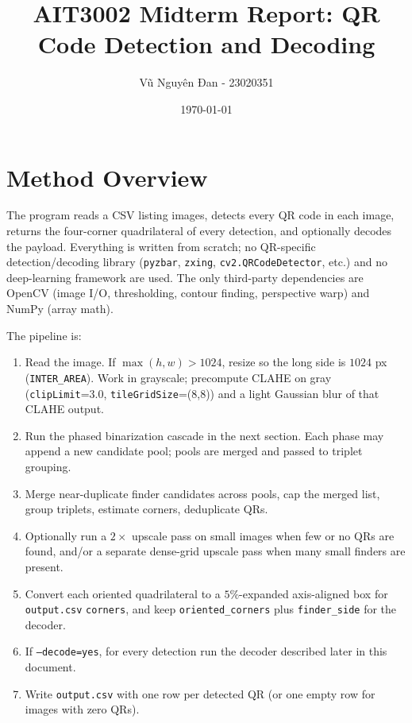 \documentclass[11pt,a4paper]{article}
\title{AIT3002 Midterm Report: QR Code Detection and Decoding}
\author{Vũ Nguyên Đan - 23020351}
\date{\today}
\begin{document}
\maketitle

\section{Method Overview}

The program reads a CSV listing images, detects every QR code in each image,
returns the four-corner quadrilateral of every detection, and optionally
decodes the payload. Everything is written from scratch; no QR-specific detection/decoding library
(\texttt{pyzbar}, \texttt{zxing}, \texttt{cv2.QRCodeDetector}, etc.) and no
deep-learning framework are used.  The only third-party dependencies are
OpenCV (image I/O, thresholding, contour finding, perspective warp) and
NumPy (array math).

The pipeline is:

\begin{enumerate}[leftmargin=1.6em, itemsep=0.2em]
    \item Read the image. If $\max(h,w) > 1024$, resize so the long side is
          $1024$ px (\texttt{INTER\_AREA}). Work in grayscale; precompute
          CLAHE on gray (\texttt{clipLimit}=3.0, \texttt{tileGridSize}=(8,8))
          and a light Gaussian blur of that CLAHE output.
    \item Run the phased binarization cascade in the next section. Each
          phase may append a new candidate pool; pools are merged and passed
          to triplet grouping.
    \item Merge near-duplicate finder candidates across pools, cap the
          merged list, group triplets, estimate corners, deduplicate QRs.
    \item Optionally run a $2\times$ upscale pass on small images when few
          or no QRs are found, and/or a separate dense-grid upscale pass
          when many small finders are present.
    \item Convert each oriented quadrilateral to a $5\%$-expanded
          axis-aligned box for \texttt{output.csv} \texttt{corners}, and
          keep \texttt{oriented\_corners} plus \texttt{finder\_side} for the
          decoder.
    \item If \texttt{---decode=yes}, for every detection run the decoder
          described later in this document.
    \item Write \texttt{output.csv} with one row per detected QR (or one
          empty row for images with zero QRs).
\end{enumerate}
\end{document}
